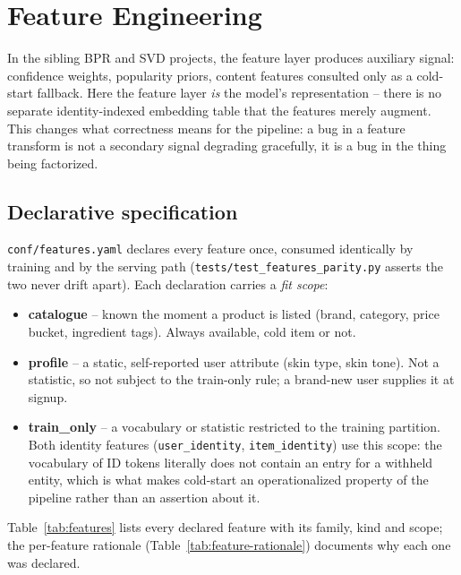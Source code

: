 \section{Feature Engineering}
\label{sec:features}

In the sibling BPR and SVD projects, the feature layer produces auxiliary
signal: confidence weights, popularity priors, content features consulted
only as a cold-start fallback. Here the feature layer \emph{is} the model's
representation -- there is no separate identity-indexed embedding table that
the features merely augment. This changes what correctness means for the
pipeline: a bug in a feature transform is not a secondary signal degrading
gracefully, it is a bug in the thing being factorized.

\subsection{Declarative specification}

\texttt{conf/features.yaml} declares every feature once, consumed
identically by training and by the serving path
(\texttt{tests/test\_features\_parity.py} asserts the two never drift apart).
Each declaration carries a \emph{fit scope}:

\begin{itemize}
  \item \textbf{catalogue} -- known the moment a product is listed (brand,
        category, price bucket, ingredient tags). Always available, cold
        item or not.
  \item \textbf{profile} -- a static, self-reported user attribute (skin
        type, skin tone). Not a statistic, so not subject to the train-only
        rule; a brand-new user supplies it at signup.
  \item \textbf{train\_only} -- a vocabulary or statistic restricted to the
        training partition. Both identity features (\texttt{user\_identity},
        \texttt{item\_identity}) use this scope: the vocabulary of ID tokens
        literally does not contain an entry for a withheld entity, which is
        what makes cold-start an operationalized property of the pipeline
        rather than an assertion about it.
\end{itemize}

Table~\ref{tab:features} lists every declared feature with its family, kind
and scope; the per-feature rationale (Table~\ref{tab:feature-rationale})
documents why each one was declared.


